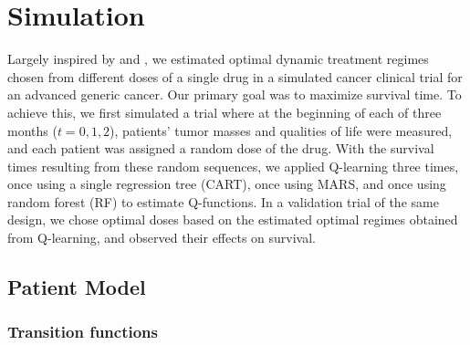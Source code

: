 \documentclass[12pt]{article}
\begin{document}



\section{Simulation} %
\label{sec:simulation}



Largely inspired by \textcite{crt} and \textcite{nsclc}, we estimated optimal dynamic treatment regimes chosen from different doses of a single drug in a simulated cancer clinical trial for an advanced generic cancer. Our primary goal was to maximize survival time. To achieve this, we first simulated a trial where at the beginning of each of three months ($t = 0, 1, 2$), patients' tumor masses and qualities of life were measured, and each patient was assigned a random dose of the drug. 
With the survival times resulting from these random sequences, we applied Q-learning three times, once using a single regression tree (CART), once using MARS, and once using random forest (RF) to estimate Q-functions. In a validation trial of the same design, we chose optimal doses based on the estimated optimal regimes obtained from Q-learning, and observed their effects on survival.

\subsection{Patient Model} %
\label{sub:vpm}

%

\subsubsection{Transition functions} %
\label{ssub:transition_functions}
\end{document}
